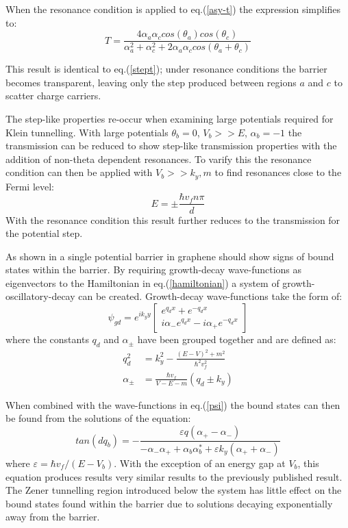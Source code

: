 \documentclass[prl,twocolumn,aps,superscriptaddress,floatfix,10pt]{revtex4}
\begin{document}
	When the resonance condition is applied to eq.(\ref{asy-t}) the expression simplifies to:
\begin{equation}
	T=\frac{4\alpha_{a}\alpha_{c}cos\left(\theta_{a}\right)cos\left(\theta_{c}\right)}{\alpha_{a}^{2}+\alpha_{c}^{2}+2\alpha_{a}\alpha_{c}cos\left(\theta_{a}+\theta_{c}\right)}
	\label{}
\end{equation}
	
	This result is identical to eq.(\ref{stept}); under resonance conditions the barrier becomes transparent, leaving only the step produced between regions $a$ and $c$ to scatter charge carriers. 

	The step-like properties re-occur when examining large potentials required for Klein tunnelling. With large potentials $\theta_{b}=0$, $V_{b}>>E$, $\alpha_{b}=-1$ the transmission can be reduced to show step-like transmission properties with the addition of non-theta dependent resonances. To varify this the resonance condition can then be applied with $V_{b}>>k_{y},m$ to find resonances close to the Fermi level:
	\begin{equation}
		E=\pm \frac{\hbar v_{f}n \pi}{d}
		\label{klein-res}
	\end{equation}
	With the resonance condition this result further reduces to the transmission for the potential step.

	As shown in \cite{b7} a single potential barrier in graphene should show signs of bound states within the barrier. By requiring growth-decay wave-functions as eigenvectors to the Hamiltonian in eq.(\ref{hamiltonian}) a system of growth-oscillatory-decay can be created. Growth-decay wave-functions take the form of:
\begin{equation}
	\psi_{gd}=
	e^{ik_{y}y}
	\left[\begin{array}{ccc}
		e^{q_{d}x}+e^{-q_{d}x}\\
		i\alpha_{-}e^{q_{d}x}-i\alpha_{+}e^{-q_{d}x}
	\end{array}\right]
	\label{psigd}
\end{equation}
where the constants $q_{d}$ and $\alpha_{\pm}$ have been grouped together and are defined as:
\begin{align}
	q_{d}^{2}&=k_{y}^{2}-\frac{\left(E-V\right)^{2}+m^{2}}{\hbar^{2}v_{f}^{2}}\\
	\alpha_{\pm}&=\frac{\hbar v_{f}}{V-E-m}\left(q_{d}\pm k_{y}\right)
\end{align}

When combined with the wave-functions in eq.(\ref{psi}) the bound states can then be found from the solutions of the equation:
\begin{equation}
	tan\left(dq_{b}\right)=-\frac{\varepsilon q\left(\alpha_{+}-\alpha_{-}\right)}{-\alpha_{-}\alpha_{+}+\alpha_{b}\alpha_{b}^{*}+\varepsilon k_{y}\left(\alpha_{+}+\alpha_{-}\right)}
	\label{boundstates}
\end{equation}
			where $\varepsilon =\hbar v_{f}/\left(E-V_{b}\right)$. With the exception of an energy gap at $V_{b}$, this equation produces results very similar results to the previously published result. The Zener tunnelling region introduced below the system has little effect on the bound states found within the barrier due to solutions decaying exponentially away from the barrier.
\end{document}
